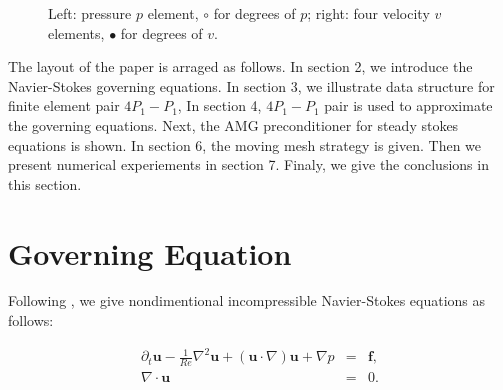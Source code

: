 \documentclass[mathpazo]{aamm}
\begin{document}
    \begin{figure}
      \centering    
      \caption{Left: pressure $p$ element, $\circ$ for degrees of $p$; 
               right: four velocity $v$ elements, $\bullet$ for degrees
               of $v$.}
      \label{fig::p-v}       
    \end{figure}
      
       The layout of the paper is arraged as follows. In section 2, we
    introduce the Navier-Stokes governing equations. In section 3, we
    illustrate data structure for finite element pair $4P_1-P_1$, In
    section 4, $4P_1-P_1$ pair is used to approximate the governing
    equations. Next, the AMG preconditioner for steady
    stokes equations is shown. In section 6, the moving mesh
    strategy is given. Then we present numerical experiements in section 7. 
    Finaly, we give the conclusions in this section.

\section{Governing Equation}
    \label{sec2} Following \cite{elman2005finite}, we
    give nondimentional incompressible Navier-Stokes equations as
    follows:
    
    \begin{equation}
      \begin{array}{rcl}
         \partial_t \mathbf{u} - \frac{1}{Re} \nabla^2 \mathbf{u} +
        (\mathbf{u} \cdot \nabla )\mathbf{u} + \nabla p & =
        & \mathbf{f},\\
        \nabla \cdot \mathbf{u} & = & 0.
      \end{array}
      \label{eq::NS}
    \end{equation}
\end{document}

